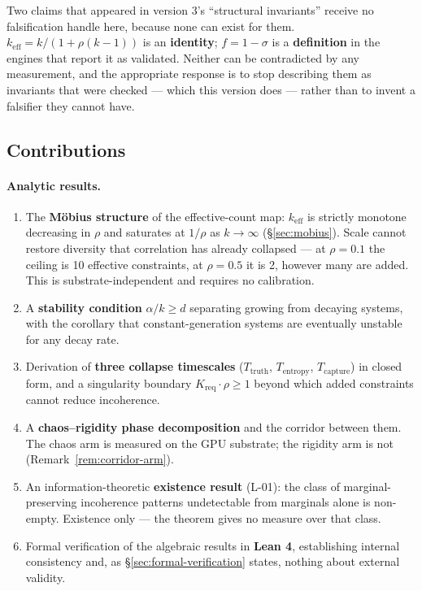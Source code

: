 \documentclass[11pt,a4paper]{article}
\theoremstyle{definition}
\theoremstyle{remark}
\newcommand{\keff}{k_{\text{eff}}}
\newcommand{\Kreq}{K_{\text{req}}}
\newcommand{\Ttruth}{T_{\text{truth}}}
\newcommand{\Tentropy}{T_{\text{entropy}}}
\newcommand{\Tcapture}{T_{\text{capture}}}
\begin{document}
Two claims that appeared in version 3's ``structural invariants'' receive no falsification
handle here, because none can exist for them. $\keff = k/(1+\rho(k-1))$ is an \textbf{identity};
$f = 1 - \sigma$ is a \textbf{definition} in the engines that report it as validated. Neither
can be contradicted by any measurement, and the appropriate response is to stop describing them
as invariants that were checked --- which this version does --- rather than to invent a
falsifier they cannot have.

\subsection{Contributions}

\paragraph{Analytic results.}
\begin{enumerate}
    \item The \textbf{M\"obius structure} of the effective-count map: $\keff$ is strictly monotone decreasing in $\rho$ and saturates at $1/\rho$ as $k \to \infty$ (\S\ref{sec:mobius}). Scale cannot restore diversity that correlation has already collapsed --- at $\rho = 0.1$ the ceiling is 10 effective constraints, at $\rho = 0.5$ it is 2, however many are added. This is substrate-independent and requires no calibration.

    \item A \textbf{stability condition} $\alpha/k \geq d$ separating growing from decaying systems, with the corollary that constant-generation systems are eventually unstable for any decay rate.

    \item Derivation of \textbf{three collapse timescales} ($\Ttruth$, $\Tentropy$, $\Tcapture$) in closed form, and a singularity boundary $\Kreq \cdot \rho \geq 1$ beyond which added constraints cannot reduce incoherence.

    \item A \textbf{chaos--rigidity phase decomposition} and the corridor between them. The chaos arm is measured on the GPU substrate; the rigidity arm is not (Remark~\ref{rem:corridor-arm}).

    \item An information-theoretic \textbf{existence result} (L-01): the class of marginal-preserving incoherence patterns undetectable from marginals alone is non-empty. Existence only --- the theorem gives no measure over that class.

    \item Formal verification of the algebraic results in \textbf{Lean 4}, establishing internal consistency and, as \S\ref{sec:formal-verification} states, nothing about external validity.
\end{enumerate}
\end{document}
